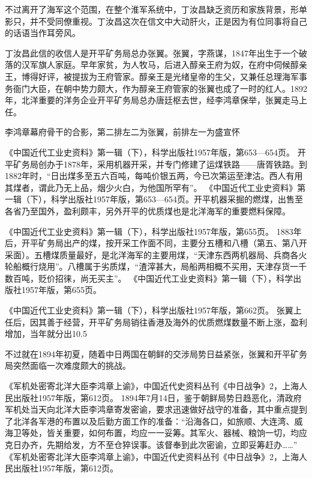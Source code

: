 \documentclass[12pt,UTF8]{ctexbook}
\begin{document}
不过离开了海军这个范围，在整个淮军系统中，丁汝昌缺乏资历和家族背景，形单影只，并不受同僚重视。丁汝昌这次在信文中大动肝火，正是因为有位同事将自己的话语当作耳旁风。

丁汝昌此信的收信人是开平矿务局总办张翼。张翼，字燕谋，1847年出生于一个破落的汉军旗人家庭。早年家贫，为人牧马，后进入醇亲王府为奴，在府中伺候醇亲王，博得好评，被提拔为王府管家。醇亲王是光绪皇帝的生父，又兼任总理海军事务衙门大臣，在朝中势力颇大，作为醇亲王府管家的张翼也成了一时的红人。1892年，北洋重要的洋务企业开平矿务局总办唐廷枢去世，经李鸿章保举，张翼走马上任。


李鸿章幕府骨干的合影，第二排左二为张翼，前排左一为盛宣怀

《中国近代工业史资料》第一辑（下），科学出版社1957年版，第653—654页。
开平矿务局创办于1878年，采用机器开采，并专门修建了运煤铁路——唐胥铁路。到1882年时，“日出煤多至五六百吨，每吨价银五两，今已次第运至津沽。西人有用其煤者，谓此乃无上品，烟少火白，为他国所罕有”。 《中国近代工业史资料》第一辑（下），科学出版社1957年版，第653—654页。开平机器采掘的燃煤，出售至各省乃至国外，盈利颇丰，另外开平的优质煤也是北洋海军的重要燃料保障。

《中国近代工业史资料》第一辑（下），科学出版社1957年版，第655页。
1883年后，开平矿务局出产的煤，按开采工作面不同，主要分五槽和八槽（第五、第八开采面）。五槽煤质量最好，是北洋海军的主要用煤，“天津东西两机器局、兵商各火轮船概行烧用”。八槽属于劣质煤，“渣滓甚大，局船两相概不买用，天津存货一千数百吨，贬价招徕，尚无买主”。 《中国近代工业史资料》第一辑（下），科学出版社1957年版，第655页。

《中国近代工业史资料》第一辑（下），科学出版社1957年版，第662页。
张翼上任后，因其善于经营，开平矿务局销往香港及海外的优质燃煤数量不断上涨，盈利增加，当年就分出10.5%

不过就在1894年初夏，随着中日两国在朝鲜的交涉局势日益紧张，张翼和开平矿务局突然面临一次难度颇大的挑战。

《军机处密寄北洋大臣李鸿章上谕》，中国近代史资料丛刊《中日战争》2，上海人民出版社1957年版，第612页。
1894年7月14日，鉴于朝鲜局势日趋恶化，清政府军机处当天向北洋大臣李鸿章寄发密谕，要求迅速做好战守的准备，其中重点提到了北洋各军港的布置以及后勤方面工作的准备：“沿海各口，如旅顺、大连湾、威海卫等处，皆关重要，如何布置，均应一一妥筹。其军火、器械、粮饷一切，均应克日办齐，先期给发，方不至仓猝误事。该督奉到此次密谕，立即妥筹赶办……” 《军机处密寄北洋大臣李鸿章上谕》，中国近代史资料丛刊《中日战争》2，上海人民出版社1957年版，第612页。
\end{document}
